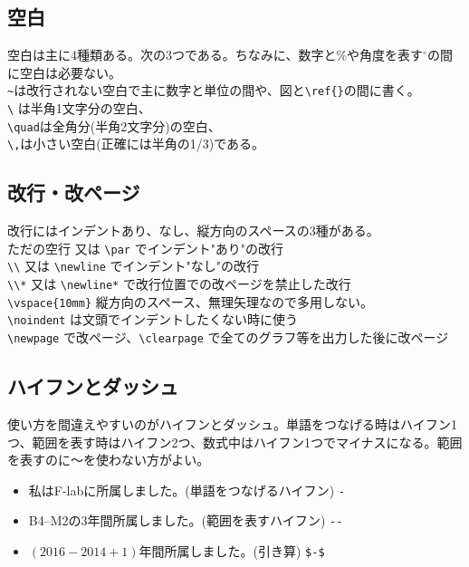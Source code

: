 \documentclass[a4j]{jsarticle}
\begin{document}
\subsection{空白}
空白は主に4種類ある。次の3つである。ちなみに、数字と\%や角度を表す$^\circ$の間に空白は必要ない。\\
\verb|~|は改行されない空白で主に数字と単位の間や、図と\verb|\ref{}|の間に書く。\\
\verb|\| は半角1文字分の空白、\\
\verb|\quad|は全角分(半角2文字分)の空白、\\
\verb|\,|は小さい空白(正確には半角の1/3)である。
\subsection{改行・改ページ}
改行にはインデントあり、なし、縦方向のスペースの3種がある。\\
ただの空行 又は \verb|\par| でインデント"あり"の改行\\
\verb|\\| 又は \verb|\newline| でインデント"なし"の改行\\
\verb|\\*| 又は \verb|\newline*| で改行位置での改ページを禁止した改行\\
\verb|\vspace{10mm}|	縦方向のスペース、無理矢理なので多用しない。\\
\verb|\noindent| は文頭でインデントしたくない時に使う\\
\verb|\newpage| で改ページ、\verb|\clearpage| で全てのグラフ等を出力した後に改ページ
\subsection{ハイフンとダッシュ}
使い方を間違えやすいのがハイフンとダッシュ。単語をつなげる時はハイフン1つ、範囲を表す時はハイフン2つ、数式中はハイフン1つでマイナスになる。範囲を表すのに～を使わない方がよい。

\begin{itemize}
 \item 私はF-labに所属しました。(単語をつなげるハイフン) \verb|-|
 \item B4--M2の3年間所属しました。(範囲を表すハイフン) \verb|--|
 \item $(2016-2014+1)$年間所属しました。(引き算) \verb|$-$|
\end{itemize}
\newpage
\end{document}
